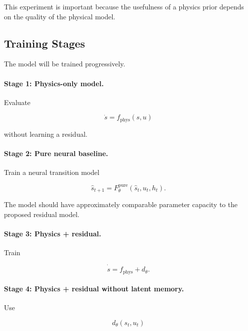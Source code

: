\documentclass[conference]{IEEEtran}
\begin{document}
This experiment is important because the usefulness of a physics prior
depends on the quality of the physical model.


\subsection{Training Stages}

The model will be trained progressively.

\paragraph{Stage 1: Physics-only model.}

Evaluate

\begin{equation}
\dot{s}
=
f_{\mathrm{phys}}(s,u)
\end{equation}

without learning a residual.

\paragraph{Stage 2: Pure neural baseline.}

Train a neural transition model

\begin{equation}
\hat{s}_{t+1}
=
F_{\theta}^{\mathrm{pure}}
(\hat{s}_t,u_t,h_t).
\end{equation}

The model should have approximately comparable parameter capacity to
the proposed residual model.

\paragraph{Stage 3: Physics + residual.}

Train

\begin{equation}
\dot{\hat{s}}
=
f_{\mathrm{phys}}
+
d_{\theta}.
\end{equation}

\paragraph{Stage 4: Physics + residual without latent memory.}

Use

\begin{equation}
d_{\theta}(s_t,u_t)
\end{equation}
\end{document}
